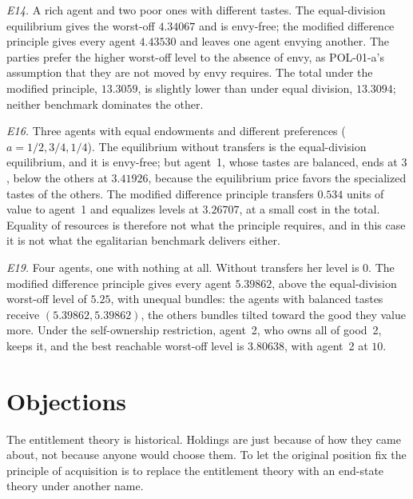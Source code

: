 \documentclass{situationist-preprint}
\begin{document}
\emph{E14.} A rich agent and two poor ones with different tastes. The equal-division equilibrium gives the worst-off $4.34067$ and is envy-free; the modified difference principle gives every agent $4.43530$ and leaves one agent envying another. The parties prefer the higher worst-off level to the absence of envy, as POL-01-a's assumption that they are not moved by envy requires. The total under the modified principle, $13.3059$, is slightly lower than under equal division, $13.3094$; neither benchmark dominates the other.

\emph{E16.} Three agents with equal endowments and different preferences ($a = 1/2, 3/4, 1/4$). The equilibrium without transfers is the equal-division equilibrium, and it is envy-free; but agent~1, whose tastes are balanced, ends at $3$, below the others at $3.41926$, because the equilibrium price favors the specialized tastes of the others. The modified difference principle transfers $0.534$ units of value to agent~1 and equalizes levels at $3.26707$, at a small cost in the total. Equality of resources is therefore not what the principle requires, and in this case it is not what the egalitarian benchmark delivers either.

\emph{E19.} Four agents, one with nothing at all. Without transfers her level is $0$. The modified difference principle gives every agent $5.39862$, above the equal-division worst-off level of $5.25$, with unequal bundles: the agents with balanced tastes receive $(5.39862, 5.39862)$, the others bundles tilted toward the good they value more. Under the self-ownership restriction, agent~2, who owns all of good~2, keeps it, and the best reachable worst-off level is $3.80638$, with agent~2 at $10$.

\section{Objections}\label{s:obj}

\begin{objection}
The entitlement theory is historical. Holdings are just because of how they came about, not because anyone would choose them. To let the original position fix the principle of acquisition is to replace the entitlement theory with an end-state theory under another name.
\end{objection}
\end{document}
